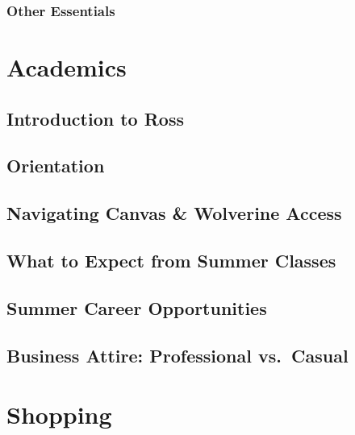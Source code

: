 \documentclass[
]{book}
\begin{document}
\hypertarget{other-essentials}{%
\subsection{Other Essentials}\label{other-essentials}}

\hypertarget{academics}{%
\chapter{Academics}\label{academics}}

\hypertarget{introduction-to-ross}{%
\section{Introduction to Ross}\label{introduction-to-ross}}

\hypertarget{orientation}{%
\section{Orientation}\label{orientation}}

\hypertarget{navigating-canvas-wolverine-access}{%
\section{Navigating Canvas \& Wolverine Access}\label{navigating-canvas-wolverine-access}}

\hypertarget{what-to-expect-from-summer-classes}{%
\section{What to Expect from Summer Classes}\label{what-to-expect-from-summer-classes}}

\hypertarget{summer-career-opportunities}{%
\section{Summer Career Opportunities}\label{summer-career-opportunities}}

\hypertarget{business-attire-professional-vs.-casual}{%
\section{Business Attire: Professional vs.~Casual}\label{business-attire-professional-vs.-casual}}

\hypertarget{shopping}{%
\chapter{Shopping}\label{shopping}}
\end{document}
